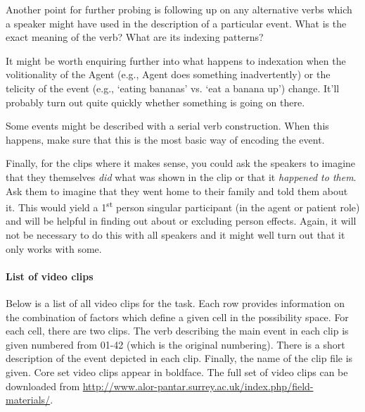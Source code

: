   Another point for further probing is following up on any alternative verbs which a speaker might have used in the description of a particular event. What is the exact meaning of the verb? What are its indexing patterns?

  It might be worth enquiring further into what happens to indexation when the volitionality of the Agent (e.g., Agent does something inadvertently) or the telicity of the event (e.g., `eating bananas' vs. `eat a banana up') change. It'll probably turn out quite quickly whether something is going on there.

  Some events might be described with a serial verb construction. When this happens, make sure that this is the most basic way of encoding the event. 

  Finally, for the clips where it makes sense, you could ask the speakers to imagine that they themselves \textit{did} what was shown in the clip or that it \textit{happened to them}. Ask them to imagine that they went home to their family and told them about it. This would yield a 1\textsuperscript{st} person singular participant (in the agent or patient role) and will be helpful in finding out about or excluding person effects. Again, it will not be necessary to do this with all speakers and it might well turn out that it only works with some.

\paragraph{List of video clips}

Below is a list of all video clips for the task. Each row provides information on the combination of factors which define a given cell in the possibility space. For each cell, there are two clips. The verb describing the main event in each clip is given numbered from 01-42 (which is the original numbering). There is a short description of the event depicted in each clip. Finally, the name of the clip file is given. Core set video clips appear in boldface. The full set of video clips can be downloaded from \url{http://www.alor-pantar.surrey.ac.uk/index.php/field-materials/}.




